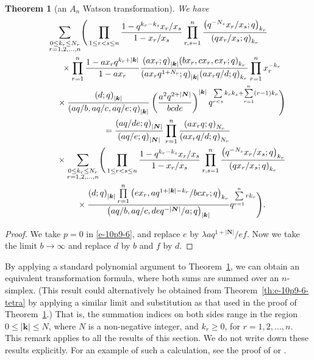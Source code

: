 \documentclass[pdftex]{sigma}
\numberwithin{equation}{section}
\newtheorem{Theorem}{Theorem}[section]
\newenvironment{Remark*}{\begin{remark*}\normalfont}{\end{remark*}}
\newcommand{\sumN}{{\left| \boldsymbol{N} \right|}}
\newcommand\sumk{{\left| \boldsymbol{k} \right|}}
\newcommand{\multsum}[3]{{\sum\limits_{\substack{{0\le #1_#3 \le #2_#3} \\
{#3 =1,2,\dots, n}}}}}
\newcommand{\qrfac}[2]{{\left({#1}; q\right)_{#2}}} %
\newcommand{\triprod}[1]{\prod\limits_{1\le r < s \le #1}}
\newcommand{\sqprod}[1]{\prod\limits_{r, s =1}^{#1}} %
\newcommand{\smallprod}[1]{\prod\limits_{r =1}^{#1}} %
\newcommand{\xover}[1]{#1_{r}/#1_{s}}
\newcommand{\vandermonde}[3]{\triprod{#3} %
 \frac{1-q^{#2_r-#2_s} \xover {#1} }{1-\xover{#1}}
}
\begin{document}
\begin{Theorem}[an $A_n$ Watson transformation] \label{th:an-watson-BS-1} We have
\begin{gather*}
\multsum{k}{N}{r} \Bigg( \vandermonde{x}{k}{n}
\sqprod n \frac{\qrfac{q^{-N_s}\xover{x}}{k_r} }{\qrfac{q\xover{x}}{k_r} } \notag \\
\qquad\quad{} \times \smallprod n \frac{1-{a x_r q^{k_r+\sumk}}}{1-{a x_r}}
\frac{\qrfac{a x_r}{\sumk}\qrfac{bx_r, cx_r, ex_r}{k_r}}
 {\qrfac{a x_rq^{1+N_r}}{\sumk}\qrfac{a x_rq/d}{k_r}} \smallprod n x_r^{-k_r}\\
 \qquad\quad {} \times \frac{\qrfac{d}{\sumk}} {\qrfac{aq/b, aq/c, aq/e}{\sumk}}
\left( \frac{a^2q^{2+\sumN}}{bcde} \right)^{\sumk}
q^{\sum\limits_{r<s}k_rk_s+\sum\limits_{r=1}^n (r-1)k_r} \Bigg) \notag \\
\qquad{} = \frac{\qrfac{a q/de}{\sumN}}{\qrfac{ a q/e}{\sumN}} \smallprod n \frac{\qrfac{a x_rq}{N_r}}
{\qrfac{a x_rq/d}{N_r}} \notag \\
\qquad\quad{} \times \multsum{k}{N}{r} \Bigg( \vandermonde{x}{k}{n}
\sqprod n \frac{\qrfac{q^{-N_s}\xover{x}}{k_r} }{\qrfac{q\xover{x}}{k_r} } \notag \\
\qquad\quad{} \times \frac{\qrfac{ d}{\sumk}\smallprod n \qrfac{ex_r, a q^{1+\sumk-k_r}/bcx_r }{k_r} }
{\qrfac{ aq/b, aq/c, deq^{-\sumN}/a}{\sumk}} q^{\sum\limits_{r=1}^n rk_r} \Bigg).%
\end{gather*}
\end{Theorem}

\begin{proof} We take $p=0$ in \eqref{e-10p9-6}, and replace $e$ by $\lambda aq^{1+\sumN}/ef$. Now we take the limit $b\to \infty$ and replace $d$ by $b $ and $f$ by $d$.
\end{proof}

\begin{Remark*} By applying a standard polynomial argument to Theorem~\ref{th:an-watson-BS-1}, we can obtain an equivalent transformation formula, where both sums are summed over an $n$-simplex. (This result could alternatively be obtained from Theorem~\ref{th:e-10p9-6-tetra} by applying a similar limit and substitution as that used in the proof of Theorem~\ref{th:an-watson-BS-1}.) That is, the summation indices on both sides range in the region $0\leq\sumk\leq N$, where $N$ is a non-negative integer, and $k_r\geq 0$, for $r=1, 2, \dots, n$. This remark applies to all the results of this section. We do not write down these results explicitly. For an example of such a calculation, see the proof of \cite[Theorem~2.4]{Milne1997} or \cite[Theorem~3.7]{BS1998}.
\end{Remark*}
\end{document}

